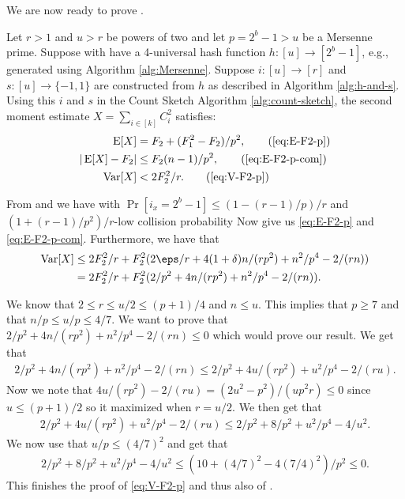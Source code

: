 We are now ready to prove .
\begingroup
    \def\thelemma{\ref{thm:h-and-s-p}}
    \begin{theorem}
        Let $r>1$ and $u>r$ be powers of two and let $p=2^b-1>u$ be a
        Mersenne prime.
        Suppose with have a 4-universal hash function $h:[u]\to[2^b-1]$, e.g.,
        generated using Algorithm \ref{alg:Mersenne}. Suppose
        $i:[u]\to[r]$ and
        $s:[u]\to\{-1,1\}$ are constructed from $h$ as described in
        Algorithm \ref{alg:h-and-s}. Using this $i$ and $s$ 
        in the Count Sketch Algorithm \ref{alg:count-sketch}, the second moment 
        estimate $X=\sum_{i\in[k]} C_i^2$ satisfies:
        \begin{align*}
           \E[X] &= F_2+(F_1^2-F_2)/p^2, \tag{\ref{eq:E-F2-p}}\\
           | \E[X] - F_2 | &\le F_2 (n - 1)/p^2, \tag{\ref{eq:E-F2-p-com}}\\
           \Var[X]&< 2F_2^2/r.\tag{\ref{eq:V-F2-p}}
        \end{align*}
    \end{theorem}
    \addtocounter{lemma}{-1}
\endgroup

From  and  we have
 with $
    \Pr[i_x = 2^b - 1] \le (1 - (r - 1)/p)/r$
   and  $(1 + (r - 1)/p^2)/r$-low collision probability
Now  give us \eqref{eq:E-F2-p}
and \eqref{eq:E-F2-p-com}. Furthermore, we have that
\begin{align*}
    \Var[X] 
        &\le 2F_2^2/r + F_2^2 (2\eps/r + 4(1 + \delta)n / (rp^2) + n^2/p^4 - 2 /(rn))
        \\&= 2F_2^2/r + F_2^2(2/p^2 + 4n/(r p^2) + n^2/p^4 - 2/(rn)) .
\end{align*}

We know that $2 \le r \le u/2 \le (p + 1)/4$ and $n \le u$.
This implies that $p \ge 7$ and that $n/p \le u/p \le 4/7$.
We want to prove that
$2/p^2 + 4n/(r p^2) + n^2/p^4 - 2/(rn) \le 0$ which would
prove our result. We get that
\begin{align*}
    2/p^2 + 4n/(r p^2) + n^2/p^4 - 2/(rn)
        \le 2/p^2 + 4u/(r p^2) + u^2/p^4 - 2/(ru) .
\end{align*}
Now we note that $4u/(r p^2) - 2/(ru) = (2u^2 - p^2)/(u p^2 r) \le 0$
since $u \le (p + 1)/2$ so it maximized when $r = u/2$. We then get
that
\begin{align*}
    2/p^2 + 4u/(r p^2) + u^2/p^4 - 2/(ru)
        \le 2/p^2 + 8/p^2 + u^2 / p^4 - 4/u^2 .
\end{align*}
We now use that $u/p \le (4/7)^2$ and get that
\begin{align*}
    2/p^2 + 8/p^2 + u^2 / p^4 - 4/u^2
        \le (10 + (4/7)^2 - 4 (7/4)^2)/p^2
        \le 0 .
\end{align*}
This finishes the proof of \eqref{eq:V-F2-p} and thus also of .

